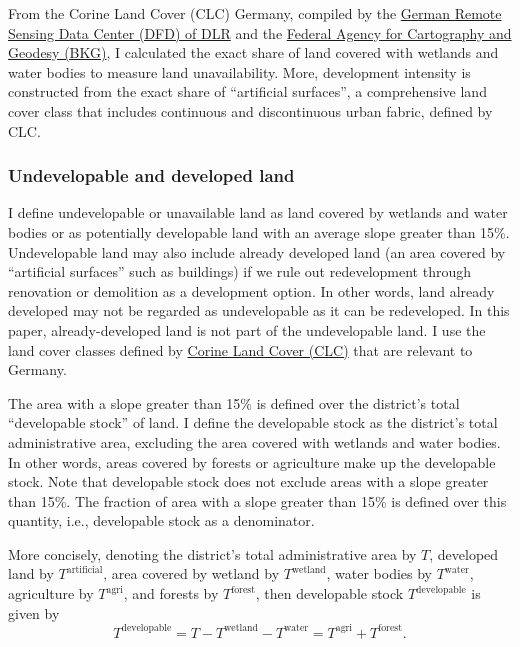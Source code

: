 \documentclass[
  12pt,
]{article}
\begin{document}
From the Corine Land Cover (CLC) Germany, compiled by the
\href{https://www.dlr.de/eoc/en/desktopdefault.aspx/tabid-11882/20871_read-48836}{German
Remote Sensing Data Center (DFD) of DLR} and the
\href{https://www.bkg.bund.de}{Federal Agency for Cartography and
Geodesy (BKG)}, I calculated the exact share of land covered with
wetlands and water bodies to measure land unavailability. More,
development intensity is constructed from the exact share of
``artificial surfaces'', a comprehensive land cover class that includes
continuous and discontinuous urban fabric, defined by CLC.

\subsubsection{Undevelopable and developed land}\label{sec-constraints}

I define undevelopable or unavailable land as land covered by wetlands
and water bodies or as potentially developable land with an average
slope greater than 15\%. Undevelopable land may also include already
developed land (an area covered by ``artificial surfaces'' such as
buildings) if we rule out redevelopment through renovation or demolition
as a development option. In other words, land already developed may not
be regarded as undevelopable as it can be redeveloped. In this paper,
already-developed land is not part of the undevelopable land. I use the
land cover classes defined by
\href{https://land.copernicus.eu/user-corner/technical-library/corine-land-cover-nomenclature-guidelines/html/index.html}{Corine
Land Cover (CLC)} that are relevant to Germany.

The area with a slope greater than 15\% is defined over the district's
total ``developable stock'' of land. I define the developable stock as
the district's total administrative area, excluding the area covered
with wetlands and water bodies. In other words, areas covered by forests
or agriculture make up the developable stock. Note that developable
stock does not exclude areas with a slope greater than 15\%. The
fraction of area with a slope greater than 15\% is defined over this
quantity, i.e., developable stock as a denominator.

More concisely, denoting the district's total administrative area by
\(T\), developed land by \(T^{\text{artificial}}\), area covered by
wetland by \(T^{\text{wetland}}\), water bodies by \(T^{\text{water}}\),
agriculture by \(T^{\text{agri}}\), and forests by
\(T^{\text{forest}}\), then developable stock \(T^{\text{developable}}\)
is given by \[
T^{\text{developable}} = T - T^{\text{wetland}} - T^{\text{water}} = T^{\text{agri}}  + T^{\text{forest}}.
\]
\end{document}
